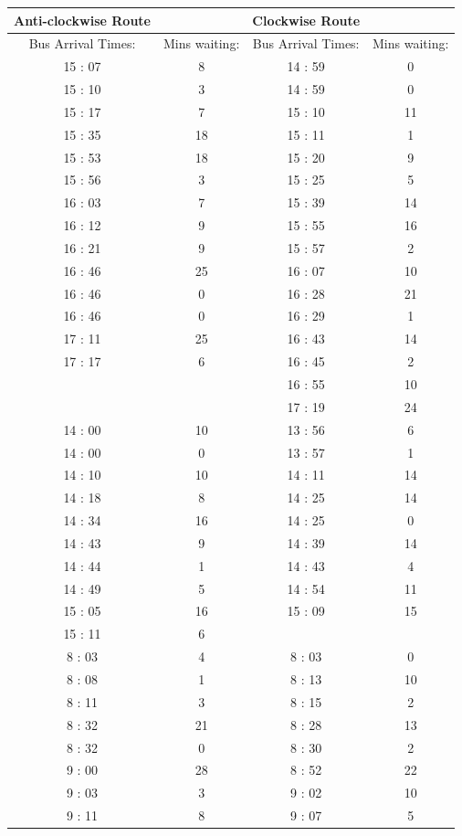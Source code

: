 {\scriptsize
\begin{table}[tph]
\centering
\begin{tabular}{|cc|cc|}\hline
\bf{Anti-clockwise Route}		&		&\bf{Clockwise Route}			&		\\	\hline
Bus Arrival Times:			&	Mins waiting:	&	Bus Arrival Times:			&	Mins waiting:	\\	\hline
15	:	07	&	8	&	14	:	59	&	0	\\	
15	:	10	&	3	&	14	:	59	&	0	\\	
15	:	17	&	7	&	15	:	10	&	11	\\	
15	:	35	&	18	&	15	:	11	&	1	\\	
15	:	53	&	18	&	15	:	20	&	9	\\	
15	:	56	&	3	&	15	:	25	&	5	\\	
16	:	03	&	7	&	15	:	39	&	14	\\	
16	:	12	&	9	&	15	:	55	&	16	\\	
16	:	21	&	9	&	15	:	57	&	2	\\	
16	:	46	&	25	&	16	:	07	&	10	\\	
16	:	46	&	0	&	16	:	28	&	21	\\	
16	:	46	&	0	&	16	:	29	&	1	\\	
17	:	11	&	25	&	16	:	43	&	14	\\	
17	:	17	&	6	&	16	:	45	&	2	\\	
			&		&	16	:	55	&	10	\\	
			&		&	17	:	19	&	24	\\	\hline
14	:	00	&	10	&	13	:	56	&	6	\\	
14	:	00	&	0	&	13	:	57	&	1	\\	
14	:	10	&	10	&	14	:	11	&	14	\\	
14	:	18	&	8	&	14	:	25	&	14	\\	
14	:	34	&	16	&	14	:	25	&	0	\\	
14	:	43	&	9	&	14	:	39	&	14	\\	
14	:	44	&	1	&	14	:	43	&	4	\\	
14	:	49	&	5	&	14	:	54	&	11	\\	
15	:	05	&	16	&	15	:	09	&	15	\\	
15	:	11	&	6	&				&		\\	\hline
8	:	03	&	4	&	8	:	03	&	0	\\	
8	:	08	&	1	&	8	:	13	&	10	\\	
8	:	11	&	3	&	8	:	15	&	2	\\	
8	:	32	&	21	&	8	:	28	&	13	\\	
8	:	32	&	0	&	8	:	30	&	2	\\	
9	:	00	&	28	&	8	:	52	&	22	\\	
9	:	03	&	3	&	9	:	02	&	10	\\	
9	:	11	&	8	&	9	:	07	&	5	\\	
	\hline
\end{tabular}


\end{table}}
